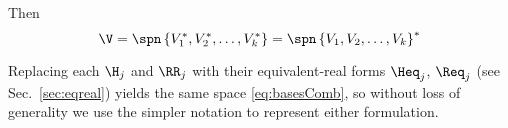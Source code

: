 Then
\begin{equation}
	\V = \spn\left\{V_1^*, V_2^*, \ldots, V_k^*\right\}
	= \spn\left\{ V_1, V_2, \ldots, V_k\right\}^*
\label{eq:basesComb}
\end{equation}
\begin{note}
Replacing each $\H_j$ and $\RR_j$  with their equivalent-real
forms $\Heq_j$, $\Req_j$ (see Sec.~\ref{sec:eqreal})
yields the same space  \eqref{eq:basesComb}, so without loss of generality we
use the simpler notation to represent either formulation.
\end{note}

